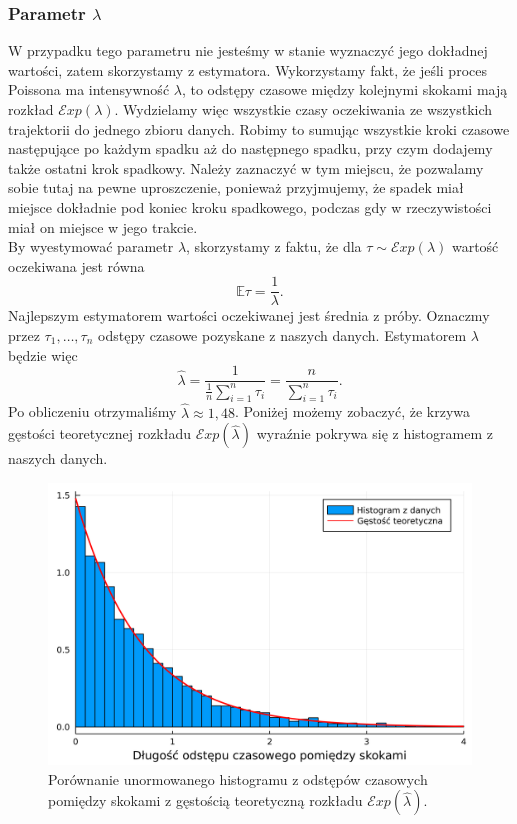 \documentclass[12pt]{mwart}
\begin{document}
	\subsubsection{Parametr {\boldmath $\lambda$}}
	\noindent W przypadku tego parametru nie jesteśmy w stanie wyznaczyć jego dokładnej wartości, zatem skorzystamy z estymatora. Wykorzystamy fakt, że jeśli proces Poissona ma intensywność $\lambda$, to odstępy czasowe między kolejnymi skokami mają rozkład $\mathcal{E}xp(\lambda)$. Wydzielamy więc wszystkie czasy oczekiwania ze wszystkich trajektorii do jednego zbioru danych. Robimy to sumując wszystkie kroki czasowe następujące po każdym spadku aż do następnego spadku, przy czym dodajemy także ostatni krok spadkowy. Należy zaznaczyć w tym miejscu, że pozwalamy sobie tutaj na pewne uproszczenie, ponieważ przyjmujemy, że spadek miał miejsce dokładnie pod koniec kroku spadkowego, podczas gdy w rzeczywistości miał on miejsce w jego trakcie.\vspace{1.5mm}\\
	By wyestymować parametr $\lambda$, skorzystamy z faktu, że dla $\tau \sim \mathcal{E}xp(\lambda)$ wartość oczekiwana jest równa
	$$ \mathbb{E}\tau = \frac{1}{\lambda}. $$
	Najlepszym estymatorem wartości oczekiwanej jest średnia z próby. Oznaczmy przez $\tau_1, \dots, \tau_n$ odstępy czasowe pozyskane z naszych danych. Estymatorem $\lambda$ będzie więc
	$$ \widehat{\lambda} = \frac{1}{\frac{1}{n}\sum\limits_{i=1}^n \tau_i} = \frac{n}{\sum\limits_{i=1}^n \tau_i}. $$
	Po obliczeniu otrzymaliśmy $\widehat{\lambda} \approx 1,48$. Poniżej możemy zobaczyć, że krzywa gęstości teoretycznej rozkładu $\mathcal{E}xp\left(\widehat{\lambda}\right)$ wyraźnie pokrywa się z histogramem z naszych danych.
	
	\begin{figure}[H]
		\centering
		\includegraphics[width=\columnwidth]{fig/lambda.pdf}
		\caption{Porównanie unormowanego histogramu z odstępów czasowych pomiędzy skokami z gęstością teoretyczną rozkładu $\mathcal{E}xp\left(\widehat{\lambda}\right)$.}
	\end{figure}
	
\end{document}
